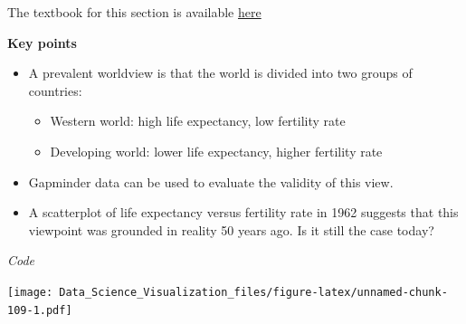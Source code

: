 \documentclass[
]{article}
\newenvironment{Shaded}{\begin{snugshade}}{\end{snugshade}}
\newcommand{\CommentTok}[1]{\textcolor[rgb]{0.56,0.35,0.01}{\textit{#1}}}
\newcommand{\DataTypeTok}[1]{\textcolor[rgb]{0.13,0.29,0.53}{#1}}
\newcommand{\DecValTok}[1]{\textcolor[rgb]{0.00,0.00,0.81}{#1}}
\newcommand{\KeywordTok}[1]{\textcolor[rgb]{0.13,0.29,0.53}{\textbf{#1}}}
\newcommand{\NormalTok}[1]{#1}
\newcommand{\OperatorTok}[1]{\textcolor[rgb]{0.81,0.36,0.00}{\textbf{#1}}}
\newcommand{\StringTok}[1]{\textcolor[rgb]{0.31,0.60,0.02}{#1}}
\providecommand{\tightlist}{%
  \setlength{\itemsep}{0pt}\setlength{\parskip}{0pt}}
\begin{document}
The textbook for this section is available
\href{https://rafalab.github.io/dsbook/gapminder.html\#scatterplots}{here}

\textbf{Key points}

\begin{itemize}
\tightlist
\item
  A prevalent worldview is that the world is divided into two groups of
  countries:

  \begin{itemize}
  \tightlist
  \item
    Western world: high life expectancy, low fertility rate
  \item
    Developing world: lower life expectancy, higher fertility rate
  \end{itemize}
\item
  Gapminder data can be used to evaluate the validity of this view.
\item
  A scatterplot of life expectancy versus fertility rate in 1962
  suggests that this viewpoint was grounded in reality 50 years ago. Is
  it still the case today?
\end{itemize}

\emph{Code}

\begin{Shaded}
\end{Shaded}

\texttt{[image: Data\_Science\_Visualization\_files/figure-latex/unnamed-chunk-109-1.pdf]}

\begin{Shaded}
\end{Shaded}
\end{document}
